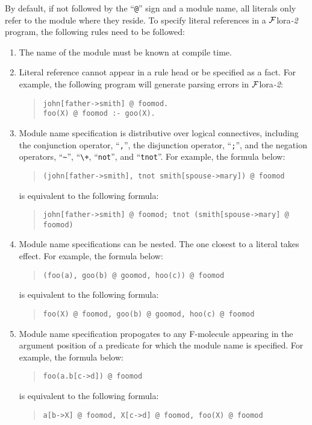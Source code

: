 \documentclass[11pt]{article}
\newcommand{\FLORA}{{\mbox{${\cal F}${\sc lora}\rm\emph{-2}}}\xspace}
\begin{document}
%
By default, if not followed by the ``\verb|@|'' sign and a module
name, all literals only refer to the module where they reside. To specify
literal references in a \FLORA program, the following rules need to be
followed:
\begin{enumerate}
\item The name of the module must be known at compile time.

\item Literal reference cannot appear in a rule head or be specified as
      a fact. For example, the following program will generate
      parsing errors in \FLORA:
      \begin{quote}
      \verb|john[father->smith] @ foomod.| \\
      \verb|foo(X) @ foomod :- goo(X).|
      \end{quote}

\item Module name specification is distributive over logical connectives,
      including the conjunction operator, ``\verb|,|'', the disjunction operator,
      ``\verb|;|'', and the negation operators, ``\verb|~|'', ``\verb|\+|,
      ``\verb|not|'', and ``\verb|tnot|''. For example, the formula below:
      \begin{quote}
      \verb|(john[father->smith], tnot smith[spouse->mary]) @ foomod|
      \end{quote}
      is equivalent to the following formula:
      \begin{quote}
      \verb|john[father->smith] @ foomod; tnot (smith[spouse->mary] @ foomod)|
      \end{quote}

\item Module name specifications can be nested. The one closest to a literal
      takes effect. For example, the formula below:
      \begin{quote}
      \verb|(foo(a), goo(b) @ goomod, hoo(c)) @ foomod|
      \end{quote}
      is equivalent to the following formula:
      \begin{quote}
      \verb|foo(X) @ foomod, goo(b) @ goomod, hoo(c) @ foomod|
      \end{quote}

\item Module name specification propogates to any F-molecule appearing
      in the argument position of a predicate for which the module name is
      specified. For example, the formula below:
      \begin{quote}
      \verb|foo(a.b[c->d]) @ foomod|
      \end{quote}
      is equivalent to the following formula:
      \begin{quote}
      \verb|a[b->X] @ foomod, X[c->d] @ foomod, foo(X) @ foomod|
      \end{quote}


\end{enumerate}
\end{document}
